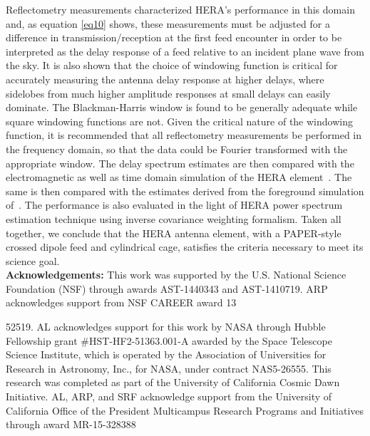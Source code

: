 \documentclass[twocolumn]{emulateapj}
\begin{document}
    Reflectometry measurements characterized HERA's performance in this
    domain and, as equation \ref{eq10} shows, these measurements must be adjusted
    for a difference in transmission/reception at the first feed encounter in
    order to be interpreted as the delay response of a feed relative to an incident
    plane wave from the sky.  It is also shown that the choice of windowing
    function is critical for accurately measuring the antenna delay response at
    higher delays, where sidelobes from much higher amplitude responses at small
    delays can easily dominate. The Blackman-Harris window is found to be generally
    adequate while square windowing functions are not.  Given the critical nature
    of the windowing function, it is recommended that all reflectometry
    measurements be performed in the frequency domain, so that the data could be
    Fourier transformed with the appropriate window.  The delay spectrum estimates
    are then compared with the electromagnetic as well as time domain simulation of
    the HERA element~\citep{ddboer_et_al2016, Ewall-Wice_et_al2016}. The
    same is then compared with the estimates derived from the foreground simulation
    of~\cite{Thyagarajan_et_al2016}. The performance is also evaluated in the light
    of HERA power spectrum estimation technique using inverse covariance weighting
    formalism.  Taken all together, we conclude that the HERA antenna element,
    with a PAPER-style crossed dipole feed and cylindrical cage, satisfies the criteria necessary to meet its science
    goal. \\
    
    {\bf Acknowledgements:}  
This work was supported by the U.S. National Science Foundation (NSF) through awards AST-1440343 and AST-1410719.
ARP acknowledges support from NSF CAREER award 13

52519.
AL acknowledges support for this work by NASA through Hubble Fellowship grant \#HST-HF2-51363.001-A awarded by the Space Telescope Science Institute, which is operated by the Association of Universities for Research in Astronomy, Inc., for NASA, under contract NAS5-26555.
This research was completed as part of the University of California Cosmic Dawn Initiative. AL, ARP, and SRF acknowledge support from the University of California Office of the President Multicampus Research Programs and Initiatives through award MR-15-328388

    
    {}
    
    
\end{document}
